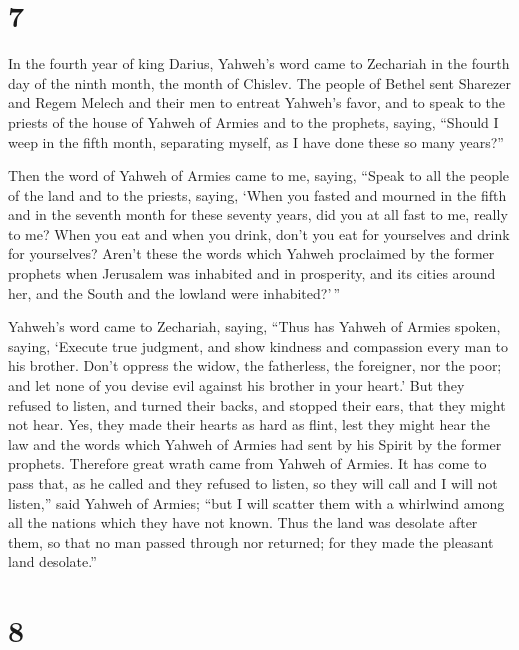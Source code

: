 \hypertarget{section-6}{%
\section{7}\label{section-6}}

 In the fourth year of king Darius, Yahweh's word came to
Zechariah in the fourth day of the ninth month, the month of Chislev.
 The people of Bethel sent Sharezer and Regem Melech and
their men to entreat Yahweh's favor,  and to speak to the
priests of the house of Yahweh of Armies and to the prophets, saying,
``Should I weep in the fifth month, separating myself, as I have done
these so many years?''

 Then the word of Yahweh of Armies came to me, saying,
 ``Speak to all the people of the land and to the priests,
saying, `When you fasted and mourned in the fifth and in the seventh
month for these seventy years, did you at all fast to me, really to me?
 When you eat and when you drink, don't you eat for
yourselves and drink for yourselves?  Aren't these the words
which Yahweh proclaimed by the former prophets when Jerusalem was
inhabited and in prosperity, and its cities around her, and the South
and the lowland were inhabited?'\,''

 Yahweh's word came to Zechariah, saying, 
``Thus has Yahweh of Armies spoken, saying, `Execute true judgment, and
show kindness and compassion every man to his brother. 
Don't oppress the widow, the fatherless, the foreigner, nor the poor;
and let none of you devise evil against his brother in your heart.'
 But they refused to listen, and turned their backs, and
stopped their ears, that they might not hear.  Yes, they
made their hearts as hard as flint, lest they might hear the law and the
words which Yahweh of Armies had sent by his Spirit by the former
prophets. Therefore great wrath came from Yahweh of Armies.
 It has come to pass that, as he called and they refused to
listen, so they will call and I will not listen,'' said Yahweh of
Armies;  ``but I will scatter them with a whirlwind among
all the nations which they have not known. Thus the land was desolate
after them, so that no man passed through nor returned; for they made
the pleasant land desolate.''

\hypertarget{section-7}{%
\section{8}\label{section-7}}

